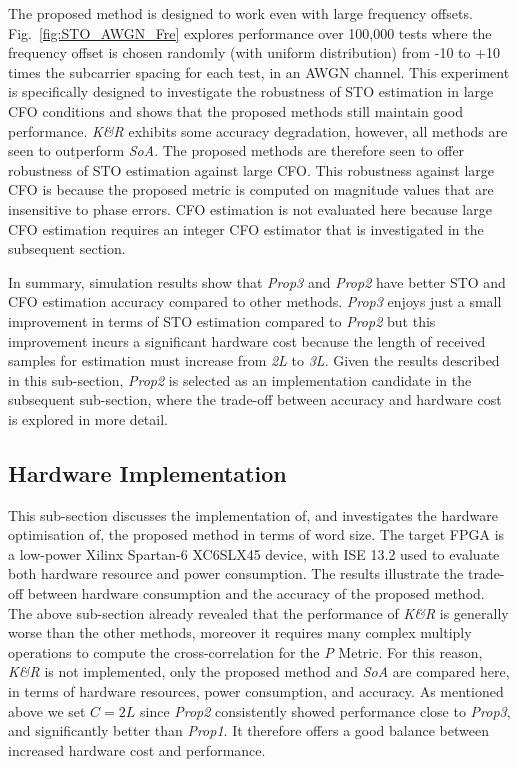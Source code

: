 The proposed method is designed to work even with large frequency offsets.
Fig.~\ref{fig:STO_AWGN_Fre} explores performance over 100,000 tests where the frequency offset is chosen randomly (with uniform distribution) from -10 to +10 times the subcarrier spacing for each test, in an AWGN channel.
This experiment is specifically designed to investigate the robustness of STO estimation in large CFO conditions and shows that the proposed methods still maintain good performance. \textit{K\&R} exhibits some accuracy degradation, however, all methods are seen to outperform \textit{SoA}. The proposed methods are therefore seen to offer robustness of STO estimation against large CFO.
This robustness against large CFO is because the proposed metric is computed on magnitude values that are insensitive to phase errors.
CFO estimation is not evaluated here because large CFO estimation requires an integer CFO estimator that is investigated in the subsequent section.

In summary, simulation results show that \textit{Prop3} and \textit{Prop2} have better STO and CFO estimation accuracy compared to other methods. 
\textit{Prop3} enjoys just a small improvement in terms of STO estimation compared to \textit{Prop2} but this improvement incurs a significant hardware cost because the length of received samples for estimation must increase from \emph{2L} to \emph{3L}. 
Given the results described in this sub-section, \textit{Prop2} is selected as an implementation candidate in the subsequent sub-section, where the trade-off between accuracy and hardware cost is explored in more detail.

\subsection{Hardware Implementation}
This sub-section discusses the implementation of, and investigates the hardware optimisation of, the proposed method in terms of word size. The target FPGA is a low-power Xilinx Spartan-6 XC6SLX45 device, with ISE 13.2 used to evaluate both hardware resource and power consumption.
The results illustrate the trade-off between hardware consumption and the accuracy of the proposed method.
The above sub-section already revealed that the performance of \textit{K\&R} is generally worse than the other methods, moreover it requires many complex multiply operations to compute the cross-correlation for the \emph{P} Metric. For this reason, \textit{K\&R} is not implemented, only the proposed method and \textit{SoA} are compared here, in terms of hardware resources, power consumption, and accuracy. As mentioned above we set  $C=2L$ since \textit{Prop2} consistently showed performance close to \textit{Prop3}, and significantly better than \textit{Prop1}. It  therefore offers a good balance between increased hardware cost and performance.

